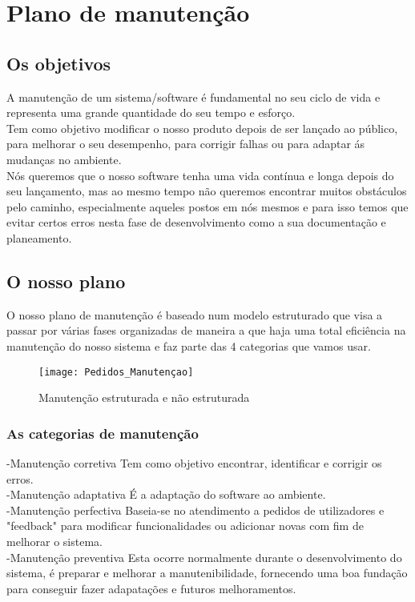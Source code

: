 \chapter{Plano de manutenção}
\label{plano_de_manutenção}
\section{Os objetivos}
A manutenção de um sistema/software é fundamental no seu ciclo de vida e representa uma grande quantidade do seu tempo e esforço.\\
Tem como objetivo modificar o nosso produto depois de ser lançado ao público, para melhorar o seu desempenho, para corrigir falhas ou para adaptar ás mudanças no ambiente.\\
Nós queremos que o nosso software tenha uma vida contínua e longa depois do seu lançamento, mas ao mesmo tempo não queremos encontrar muitos obstáculos pelo caminho, especialmente aqueles postos em nós mesmos e para isso temos que evitar certos erros nesta fase de desenvolvimento como a sua documentação e planeamento.
\section{O nosso plano}
O nosso plano de manutenção é baseado num modelo estruturado que visa a passar por várias fases organizadas de maneira a que haja uma total eficiência na manutenção do nosso sistema e faz parte das 4 categorias que vamos usar.

\begin{figure}[H]
	\centering
	\texttt{[image: Pedidos\_Manutençao]}
	\caption{Manutenção estruturada e não estruturada}
	\label{fig:Pedidos_Manutencao}
\end{figure}

\subsection{As categorias de manutenção}
-Manutenção corretiva 
Tem como objetivo encontrar, identificar e corrigir os erros.\\
-Manutenção adaptativa
É a adaptação do software ao ambiente.\\
-Manutenção perfectiva
Baseia-se no atendimento a pedidos de utilizadores e "feedback" para modificar funcionalidades ou adicionar novas com fim de melhorar o sistema.\\
-Manutenção preventiva
Esta ocorre normalmente durante o desenvolvimento do sistema, é preparar e melhorar a manutenibilidade, fornecendo uma boa fundação para conseguir fazer adapatações e futuros melhoramentos.

